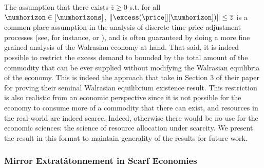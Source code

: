 \begin{remark}\label{remark:we_tatonn_bounded_demand}
        The assumption that there exists $\overline{z} \geq 0$ s.t. for all $\numhorizon \in [\numhorizons]$, $\|\excess(\price[][\numhorizon])\| \leq \overline{z}$ is a common place assumption in the analysis of discrete time price adjustment processes (see, for instance, \citet{fisher-tatonnement} or ), and is often guaranteed by doing a more fine grained analysis of the Walrasian economy at hand. That said, it is indeed possible to restrict the excess demand to bounded by the total amount of the commodity that can be ever supplied without modifying the Walrasian equilibria of the economy. This is indeed the approach that \citet{arrow-debreu} take in Section 3 of their paper for proving their seminal Walrasian equilibrium existence result. This restriction is also realistic from an economic perspective since it is not possible for the economy to consume more of a commodity that there can exist, and resources in the real-world are indeed scarce. Indeed, otherwise there would be no use for the economic sciences: the science of resource allocation under scarcity. We present the result in this format to maintain generality of the results for future work.
\end{remark}
\fi



\subsubsection{Mirror Extrat\^atonnement in Scarf Economies}


